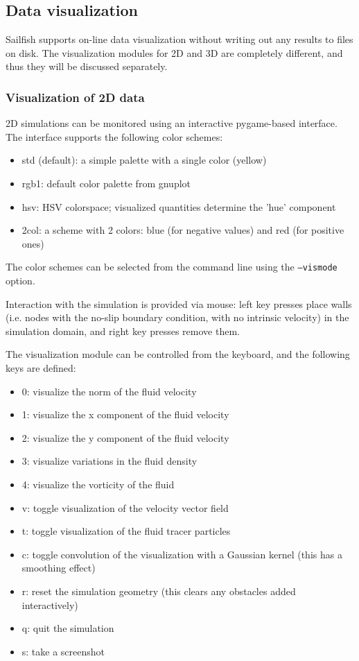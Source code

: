 \documentclass{article}
\begin{document}
\subsection{Data visualization}

Sailfish supports on-line data visualization without writing out any results
to files on disk.  The visualization modules for 2D and 3D are completely different,
and thus they will be discussed separately.

\subsubsection{Visualization of 2D data}

2D simulations can be monitored using an interactive pygame-based interface.
The interface supports the following color schemes:
\begin{itemize}
	\item std (default): a simple palette with a single color (yellow)
	\item rgb1: default color palette from gnuplot
	\item hsv: HSV colorspace; visualized quantities determine the 'hue' component
	\item 2col: a scheme with 2 colors: blue (for negative values) and red (for positive ones)
\end{itemize}
The color schemes can be selected from the command line using the \texttt{--vismode} option.

Interaction with the simulation is provided via mouse: left key presses place walls
(i.e. nodes with the no-slip boundary condition, with no intrinsic velocity) in the
simulation domain, and right key presses remove them.

The visualization module can be controlled from the keyboard, and the following
keys are defined:
\begin{itemize}
	\item 0: visualize the norm of the fluid velocity
	\item 1: visualize the x component of the fluid velocity
	\item 2: visualize the y component of the fluid velocity
	\item 3: visualize variations in the fluid density
	\item 4: visualize the vorticity of the fluid
	\item v: toggle visualization of the velocity vector field
	\item t: toggle visualization of the fluid tracer particles
	\item c: toggle convolution of the visualization with a Gaussian kernel (this has a smoothing effect)
	\item r: reset the simulation geometry (this clears any obstacles added interactively)
	\item q: quit the simulation
	\item s: take a screenshot
\end{itemize}
\end{document}
